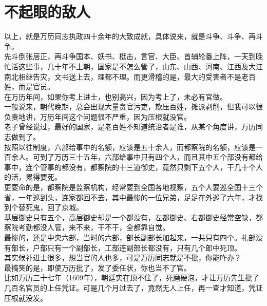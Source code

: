 \section{不起眼的敌人}
\ifnum{}
	\begin{multicols}{\theparacolNo}
\fi
以上，就是万历同志执政四十余年的大致成就，具体说来，就是斗争、斗争、再斗争。\\

先斗倒张居正，再斗争国本、妖书、梃击，言官、大臣、首辅轮番上阵，一天到晚忙活这些事，几十年不上朝，国家是不怎么管了，山东、山西、河南、江西及大江南北相继告灾，文书送上去，理都不理。而更滑稽的是，最大的受害者不是老百姓，而是官员。\\

在万历年间，如果你考上进士，也别高兴，因为考上了，未必有官做。\\

一般说来，朝代晚期，总会出现大量贪官污吏，欺压百姓，摊派剥削，但我可以很负责地讲，万历年间这个问题很不严重，因为压根就没官。\\

老子曾经说过，最好的国家，是老百姓不知道统治者是谁，从某个角度讲，万历同志做到了。\\

按照以往制度，六部给事中的名额，应该是五十余人，而都察院的名额，应该是一百余人。可到了万历三十五年，六部给事中只有四个人，而且其中五个部没有都给事中，连个管事的都没有，都察院的十三道御史，竟然只剩下五个人，干几十个人的活，累得要死。\\

更要命的是，都察院是监察机构，经常要到全国各地视察，五个人要巡全国十三个省，一年巡到头，连家都回不去，其中最惨的一位兄弟，足足在外巡了六年，才找到个替死鬼，回了京城。\\

基层御史只有五个，高层御史却是一个都没有，左都御史、右都御史经常空缺，都察院考勤都没人管，来不来，干不干，全都靠自觉。\\

最惨的，还是中央六部，当时的六部，部长副部长加起来，一共只有四个。礼部没有部长，户部只有一个副部长，工部连副部长都没有，只有几个郎中死顶。\\

其实候补进士很多，想当官的人也多，可是万历同志就是不批，你能咋办？\\

最搞笑的是，即使万历批了，发了委任状，你也当不了官。\\

比如万历三十七年（1609年），朝廷实在顶不住了，死磨硬泡，才让万历先生批了几百名官员的上任凭证。可是几个月过去了，竟然无人上任，再一查才知道，凭证压根就没发。\\


\end{multicols}
